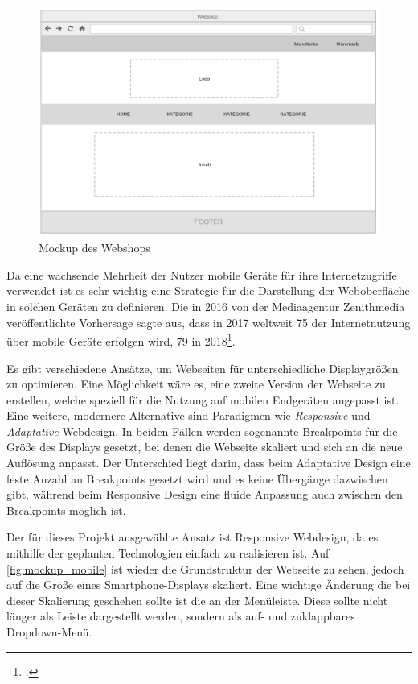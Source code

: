 \begin{figure}[ht!]
	\centering
	\includegraphics[width=\linewidth]{bilder/kap6/mockup_shop.png}
	\caption{Mockup des Webshops}
	\label{fig:mockup_shop}
\end{figure}

Da eine wachsende Mehrheit der Nutzer mobile Geräte für ihre Internetzugriffe verwendet ist es sehr wichtig eine Strategie für die Darstellung der Weboberfläche in solchen Geräten zu definieren. Die in 2016 von der Mediaagentur Zenithmedia veröffentlichte Vorhersage sagte aus, dass in 2017 weltweit 75 der Internetnutzung über mobile Geräte erfolgen wird, 79 in 2018\footcite[Vgl.][]{Zenithmedia2016}.

Es gibt verschiedene Ansätze, um Webseiten für unterschiedliche Displaygrößen zu optimieren. Eine Möglichkeit wäre es, eine zweite Version der Webseite zu erstellen, welche speziell für die Nutzung auf mobilen Endgeräten angepasst ist. Eine weitere, modernere Alternative sind Paradigmen wie \textit{Responsive} und \textit{Adaptative} Webdesign. In beiden Fällen werden sogenannte Breakpoints für die Größe des Displays gesetzt, bei denen die Webseite skaliert und sich an die neue Auflösung anpasst. Der Unterschied liegt darin, dass beim Adaptative Design eine feste Anzahl an Breakpoints gesetzt wird und es keine Übergänge dazwischen gibt, während beim Responsive Design eine fluide Anpassung auch zwischen den Breakpoints möglich ist.

Der für dieses Projekt ausgewählte Ansatz ist Responsive Webdesign, da es mithilfe der geplanten Technologien einfach zu realisieren ist. Auf \cref{fig:mockup_mobile} ist wieder die Grundstruktur der Webseite zu sehen, jedoch auf die Größe eines Smartphone-Displays skaliert. Eine wichtige Änderung die bei dieser Skalierung geschehen sollte ist die an der Menüleiste. Diese sollte nicht länger als Leiste dargestellt werden, sondern als auf- und zuklappbares Dropdown-Menü. 

